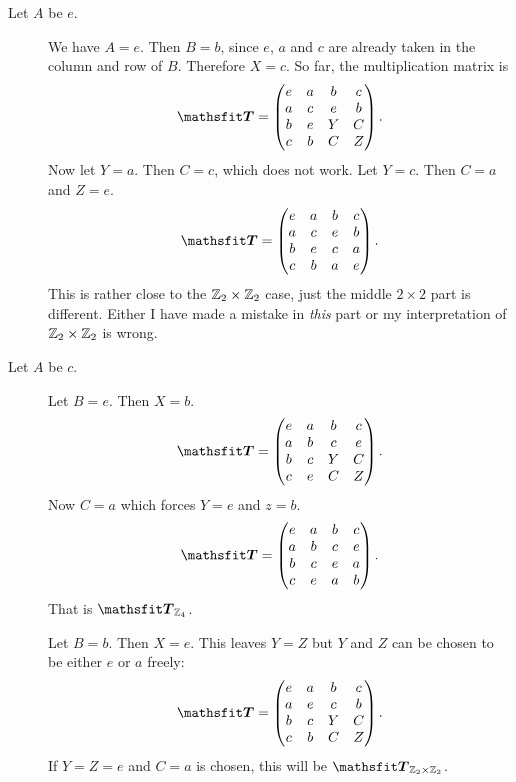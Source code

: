 \documentclass[11pt, ngerman, fleqn, DIV=15, headinclude, BCOR=1cm]{scrartcl}
\begin{document}
\begin{description}
    \item[Let $A$ be $e$.]
        We have $A = e$. Then $B = b$, since $e$, $a$ and $c$ are already taken
        in the column and row of $B$. Therefore $X = c$. So far, the
        multiplication matrix is
        \[
            \tens T =
            \begin{pmatrix}
                e & a & b & c \\
                a & c & e & b \\
                b & e & Y & C \\
                c & b & C & Z
            \end{pmatrix}.
        \]
        Now let $Y = a$. Then $C = c$, which does not work. Let $Y = c$. Then
        $C = a$ and $Z = e$.
        \[
            \tens T =
            \begin{pmatrix}
                e & a & b & c \\
                a & c & e & b \\
                b & e & c & a \\
                c & b & a & e
            \end{pmatrix}.
        \]
        This is rather close to the $\mathbb Z_2 \times \mathbb Z_2$ case, just the middle $2
        \times 2$ part is different. Either I have made a mistake in
        \emph{this} part or my interpretation of $\mathbb Z_2 \times \mathbb Z_2$ is wrong.

    \item[Let $A$ be $c$.]
        Let $B = e$. Then $X = b$.
        \[
            \tens T =
            \begin{pmatrix}
                e & a & b & c \\
                a & b & c & e \\
                b & c & Y & C \\
                c & e & C & Z
            \end{pmatrix}.
        \]
        Now $C = a$ which forces $Y = e$ and $z = b$.
        \[
            \tens T =
            \begin{pmatrix}
                e & a & b & c \\
                a & b & c & e \\
                b & c & e & a \\
                c & e & a & b
            \end{pmatrix}.
        \]
        That is $\tens T_{\Z_4}$.

        Let $B = b$. Then $X = e$. This leaves $Y = Z$ but $Y$ and $Z$ can be
        chosen to be either $e$ or $a$ freely:
        \[
            \tens T=
            \begin{pmatrix}
                e & a & b & c \\
                a & e & c & b \\
                b & c & Y & C \\
                c & b & C & Z
            \end{pmatrix}.
        \]
        If $Y = Z = e$ and $C = a$ is chosen, this will be $\tens T_{\Z_2
        \times \Z_2}$.
\end{description}
\end{document}
